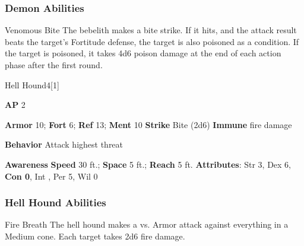 \subsubsection{Demon Abilities}

\begin{ability}{Venomous Bite}
The bebelith makes a bite strike.
If it hits, and the attack result beats the target's Fortitude defense, the target is also poisoned as a condition.
If the target is poisoned, it takes 4d6 poison damage at the end of each action phase after the first round.
\end{ability}

\begin{monsection}{Hell Hound}{4}[1]
\vspace{-1em}\vspace{-1em}
\begin{spellcontent}
\begin{spelltargetinginfo}
{\textbf{AP} 2}

\pari \textbf{Armor} 10;
\textbf{Fort} 6;
\textbf{Ref} 13;
\textbf{Ment} 10
\pari \textbf{Strike} Bite  (2d6)
\pari \textbf{Immune} fire damage


\pari \textbf{Behavior} Attack highest threat
\end{spelltargetinginfo}
\end{spellcontent}

\begin{monsterfooter}
\pari \textbf{Awareness} 
\pari \textbf{Speed} 30 ft.;
\textbf{Space} 5 ft.;
\textbf{Reach} 5 ft.
\pari \textbf{Attributes}:
Str 3,
Dex 6,
\textbf{Con 0},
Int ,
Per 5,
Wil 0
\end{monsterfooter}
\end{monsection}


\subsubsection{Hell Hound Abilities}

\begin{ability}{Fire Breath}
The hell hound makes a  vs. Armor attack against everything in a Medium cone.
\hit Each target takes 2d6 fire damage.
\end{ability}

